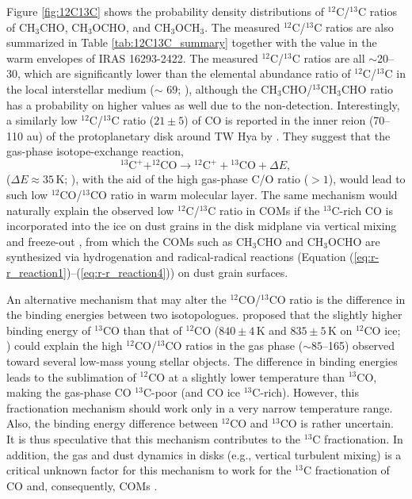 \documentclass[linenumbers, twocolumn, twocolappendix, astrosymb, times]{aastex631}
\newcommand{\acetaldehyde}{CH$_3$CHO\xspace}
\newcommand{\methylformate}{CH$_3$OCHO\xspace}
\newcommand{\dimethylether}{CH$_3$OCH$_3$\xspace}
\begin{document}
Figure \ref{fig:12C13C} shows the probability density distributions of $^{12}$C/$^{13}$C ratios of \acetaldehyde, \methylformate, and \dimethylether. The measured $^{12}$C/$^{13}$C ratios are also summarized in Table \ref{tab:12C13C_summary} together with the value in the warm envelopes of IRAS 16293-2422.  The measured $^{12}$C/$^{13}$C ratios are all $\sim$20--30, which are significantly lower than the elemental abundance ratio of $^{12}$C/$^{13}$C in the local interstellar medium ($\sim$ 69; \citealt{Wilson1999}), although the \acetaldehyde/$^{13}$CH$_3$CHO ratio has a probability on higher values as well due to the non-detection. Interestingly, a similarly low $^{12}$C/$^{13}$C ratio ($21\pm5$) of CO is reported in the inner reion (70--110 au) of the protoplanetary disk around TW Hya by \citet{Yoshida2022_12CO13CO} \citep[see also][]{Zhang2017}. They suggest that the gas-phase isotope-exchange reaction, 
\begin{equation}\label{eq:12C13C_reaction}
    ^{13}\mathrm{C}^+ + ^{12}\mathrm{CO} \to {}^{12}\mathrm{C}^+ + {}^{13}\mathrm{CO} + \Delta E,
\end{equation}
($\Delta E \approx 35$\,K; \citealt{Langer1984, Furuya2011}), with the aid of the high gas-phase C/O ratio ($> 1$), would lead to such low $^{12}$CO/$^{13}$CO ratio in warm molecular layer. The same mechanism would naturally explain the observed low $^{12}$C/$^{13}$C ratio in COMs if the $^{13}$C-rich CO is incorporated into the ice on dust grains in the disk midplane via vertical mixing and freeze-out \citep{Furuya2022}, from which the COMs such as \acetaldehyde and \methylformate are synthesized via hydrogenation and radical-radical reactions (Equation (\ref{eq:r-r_reaction1})--(\ref{eq:r-r_reaction4})) on dust grain surfaces.

An alternative mechanism that may alter the $^{12}$CO/$^{13}$CO ratio is the difference in the binding energies between two isotopologues. \citet{Smith2015} proposed that the slightly higher binding energy of $^{13}$CO than that of $^{12}$CO ($840\pm4$\,K and $835\pm5$\,K on $^{12}$CO ice; \citealt{Smith2021}) could explain the high $^{12}$CO/$^{13}$CO ratios in the gas phase ($\sim85$--165) observed toward several low-mass young stellar objects. The difference in binding energies leads to the sublimation of $^{12}$CO at a slightly lower temperature than $^{13}$CO, making the gas-phase CO $^{13}$C-poor (and CO ice $^{13}$C-rich). However, this fractionation mechanism should work only in a very narrow temperature range. Also, the binding energy difference between $^{12}$CO and $^{13}$CO is rather uncertain. It is thus speculative that this mechanism contributes to the $^{13}$C fractionation. In addition, the gas and dust dynamics in disks (e.g., vertical turbulent mixing) is a critical unknown factor for this mechanism to work for the $^{13}$C fractionation of CO and, consequently, COMs \citep[e.g.,][]{Yoshida2022_12CO13CO}.
\end{document}
